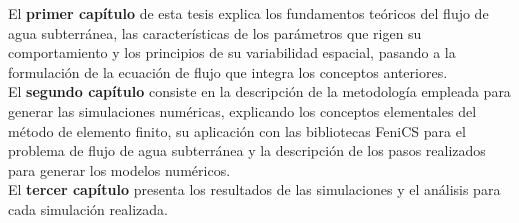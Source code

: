 El \textbf{primer capítulo} de esta tesis explica los fundamentos teóricos del flujo de agua subterránea, las características de los parámetros que rigen su comportamiento y los principios de su variabilidad espacial, pasando a la formulación de la ecuación de flujo que integra los conceptos anteriores.
\\

El \textbf{segundo capítulo} consiste en la descripción de la metodología empleada para generar las simulaciones numéricas, explicando los conceptos elementales del método de elemento finito, su aplicación con las bibliotecas FeniCS para el problema de flujo de agua subterránea y la descripción de los pasos realizados para generar los modelos numéricos.
\\

El \textbf{tercer capítulo} presenta los resultados de las simulaciones y el análisis para cada simulación realizada.

\newpage